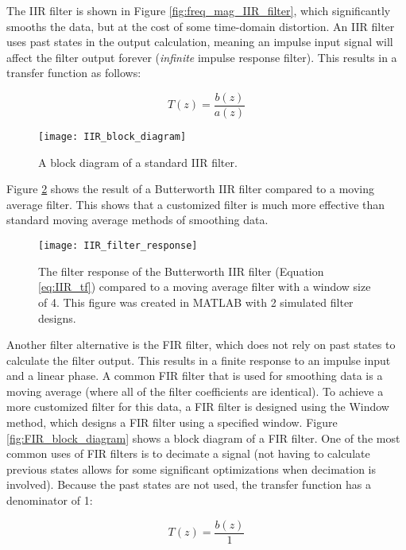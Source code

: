 The IIR filter is shown in Figure \ref{fig:freq_mag_IIR_filter}, which significantly smooths the data, but at the cost of some time-domain distortion.  An IIR filter uses past states in the output calculation, meaning an impulse input signal will affect the filter output forever (\textit{infinite} impulse response filter).  This results in a transfer function as follows:

\begin{equation}
	T(z) = \frac{b(z)}{a(z)}
\end{equation}

\begin{figure}
	\centering
	\texttt{[image: IIR\_block\_diagram]}
	\decoRule
	\caption{A block diagram of a standard IIR filter. \cite{wiki:IIR_block_diagram}}
	\label{fig:IIR_block_diagram}
\end{figure}


Figure \ref{fig:IIR_filter_response} shows the result of a Butterworth IIR filter compared to a moving average filter.  This shows that a customized filter is much more effective than standard moving average methods of smoothing data.

\begin{figure}
	\centering
	\texttt{[image: IIR\_filter\_response]}
	\decoRule
	\caption{The filter response of the Butterworth IIR filter (Equation \ref{eq:IIR_tf}) compared to a moving average filter with a window size of 4.  This figure was created in MATLAB with 2 simulated filter designs.}
	\label{fig:IIR_filter_response}
\end{figure}


Another filter alternative is the FIR filter, which does not rely on past states to calculate the filter output.  This results in a finite response to an impulse input and a linear phase.  A common FIR filter that is used for smoothing data is a moving average (where all of the filter coefficients are identical).  To achieve a more customized filter for this data, a FIR filter is designed using the Window method, which designs a FIR filter using a specified window.  Figure \ref{fig:FIR_block_diagram} shows a block diagram of a FIR filter.  One of the most common uses of FIR filters is to decimate a signal (not having to calculate previous states allows for some significant optimizations when decimation is involved).  Because the past states are not used, the transfer function has a denominator of 1:

\begin{equation}
	T(z) = \frac{b(z)}{1}
\end{equation}


